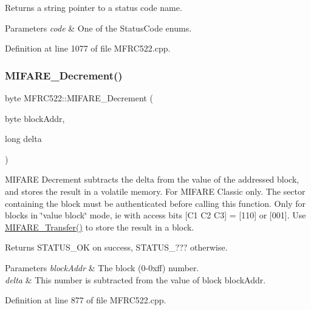 Returns a string pointer to a status code name. 
\begin{DoxyParams}{Parameters}
{\em code} & One of the Status\+Code enums. \\
\hline
\end{DoxyParams}


Definition at line 1077 of file M\+F\+R\+C522.\+cpp.

\mbox{\label{class_m_f_r_c522_a1b4732c54686bd32e2dd79cf4b5279e6}} 
\subsubsection{\texorpdfstring{M\+I\+F\+A\+R\+E\+\_\+\+Decrement()}{MIFARE\_Decrement()}}
{\footnotesize\ttfamily byte M\+F\+R\+C522\+::\+M\+I\+F\+A\+R\+E\+\_\+\+Decrement (\begin{DoxyParamCaption}\item[{byte}]{block\+Addr,  }\item[{long}]{delta }\end{DoxyParamCaption})}

M\+I\+F\+A\+RE Decrement subtracts the delta from the value of the addressed block, and stores the result in a volatile memory. For M\+I\+F\+A\+RE Classic only. The sector containing the block must be authenticated before calling this function. Only for blocks in \char`\"{}value block\char`\"{} mode, ie with access bits \mbox{[}C1 C2 C3\mbox{]} = \mbox{[}110\mbox{]} or \mbox{[}001\mbox{]}. Use \hyperlink{class_m_f_r_c522_a36299391c708a71c11c48a94c4e3f3c2}{M\+I\+F\+A\+R\+E\+\_\+\+Transfer()} to store the result in a block.

\begin{DoxyReturn}{Returns}
S\+T\+A\+T\+U\+S\+\_\+\+OK on success, S\+T\+A\+T\+U\+S\+\_\+??? otherwise. 
\end{DoxyReturn}

\begin{DoxyParams}{Parameters}
{\em block\+Addr} & The block (0-\/0xff) number. \\
\hline
{\em delta} & This number is subtracted from the value of block block\+Addr. \\
\hline
\end{DoxyParams}


Definition at line 877 of file M\+F\+R\+C522.\+cpp.

